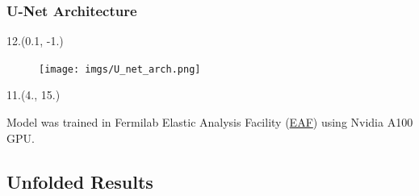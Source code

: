 \documentclass[12pt, xcolor={dvipsnames}, aspectratio = 169, sans, mathserif]{beamer}
\newenvironment{Pic}[2]
{\begin{textblock}{#1}#2
\begin{figure}}
{\end{figure}
\end{textblock}}
\begin{document}
\begin{frame}
\frametitle{U-Net Architecture}

\begin{Pic}{12.}{(0.1, -1.)}
  \texttt{[image: imgs/U\_net\_arch.png]}
\end{Pic}

\begin{textblock}{11.}(4., 15.)
\begin{scriptsize}
Model was trained in  Fermilab Elastic Analysis Facility (\textcolor{blue}{\href{https://eafjupyter.readthedocs.io/en/latest/index.html}{EAF}}) using Nvidia A100 GPU.
\end{scriptsize}
\end{textblock}

\end{frame}

\subsection{Unfolded Results}
\end{document}
